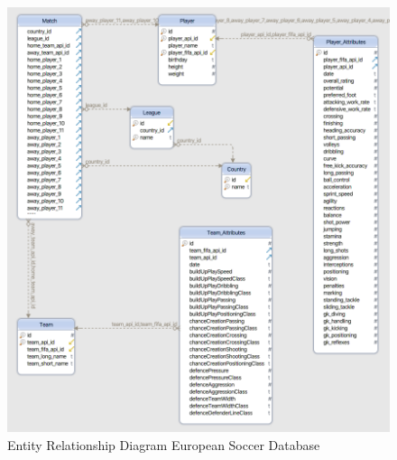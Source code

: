 \begin{figure}[H]
\centering
\includegraphics[width=1\textwidth]{images/erm.png}
\caption{Entity Relationship Diagram European Soccer Database}
\label{fig:erm}
\end{figure}